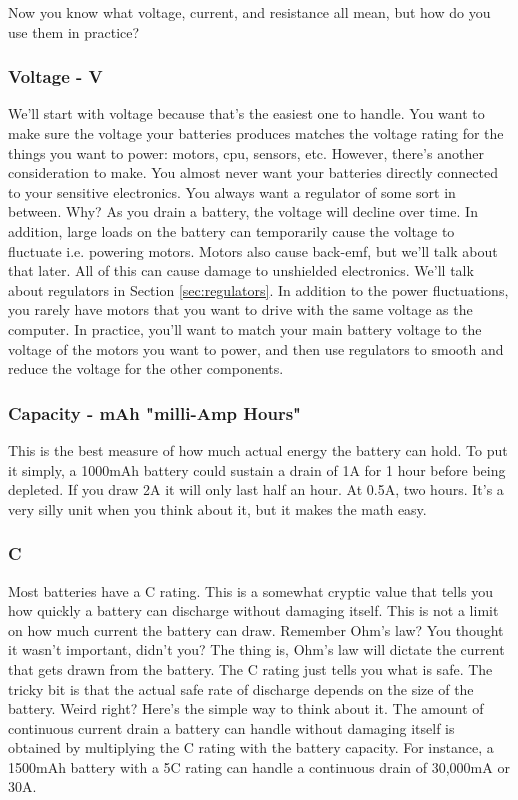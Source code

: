 Now you know what voltage, current, and resistance all mean, but how do you use them in practice? 

\subsubsection{Voltage - V}

We'll start with voltage because that's the easiest one to handle. You want to make sure the voltage your batteries produces matches the voltage rating for the things you want to power: motors, cpu, sensors, etc. However, there's another consideration to make. You almost never want your batteries directly connected to your sensitive electronics. You always want a regulator of some sort in between. Why? As you drain a battery, the voltage will decline over time. In addition, large loads on the battery can temporarily cause the voltage to fluctuate i.e. powering motors. Motors also cause back-emf, but we'll talk about that later. All of this can cause damage to unshielded electronics. We'll talk about regulators in Section \ref{sec:regulators}. In addition to the power fluctuations, you rarely have motors that you want to drive with the same voltage as the computer. In practice, you'll want to match your main battery voltage to the voltage of the motors you want to power, and then use regulators to smooth and reduce the voltage for the other components.

\subsubsection{Capacity - mAh "milli-Amp Hours"}

This is the best measure of how much actual energy the battery can hold. To put it simply, a 1000mAh battery could sustain a drain of 1A for 1 hour before being depleted. If you draw 2A it will only last half an hour. At 0.5A, two hours. It's a very silly unit when you think about it, but it makes the math easy.

\subsubsection{C}

Most batteries have a C rating. This is a somewhat cryptic value that tells you how quickly a battery can discharge without damaging itself. This is not a limit on how much current the battery can draw. Remember Ohm's law? You thought it wasn't important, didn't you? The thing is, Ohm's law will dictate the current that gets drawn from the battery. The C rating just tells you what is safe. The tricky bit is that the actual safe rate of discharge depends on the size of the battery. Weird right? Here's the simple way to think about it. The amount of continuous current drain a battery can handle without damaging itself is obtained by multiplying the C rating with the battery capacity. For instance, a 1500mAh battery with a 5C rating can handle a continuous drain of 30,000mA or 30A.


